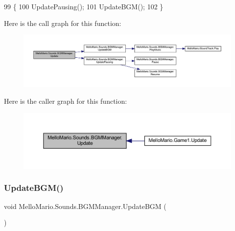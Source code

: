 \begin{DoxyCode}
99         \{
100             UpdatePausing();
101             UpdateBGM();
102         \}
\end{DoxyCode}
Here is the call graph for this function\+:
\nopagebreak
\begin{figure}[H]
\begin{center}
\leavevmode
\includegraphics[width=350pt]{classMelloMario_1_1Sounds_1_1BGMManager_a0f3110164cefbd709684211ae151020e_cgraph}
\end{center}
\end{figure}
Here is the caller graph for this function\+:
\nopagebreak
\begin{figure}[H]
\begin{center}
\leavevmode
\includegraphics[width=350pt]{classMelloMario_1_1Sounds_1_1BGMManager_a0f3110164cefbd709684211ae151020e_icgraph}
\end{center}
\end{figure}
\mbox{\label{classMelloMario_1_1Sounds_1_1BGMManager_ac40d481758a6e2812b3db145c68f46df}} 
\subsubsection{Update\+B\+G\+M()}
{\footnotesize\ttfamily void Mello\+Mario.\+Sounds.\+B\+G\+M\+Manager.\+Update\+B\+GM (\begin{DoxyParamCaption}{ }\end{DoxyParamCaption})\hspace{0.3cm}{\ttfamily [private]}}



